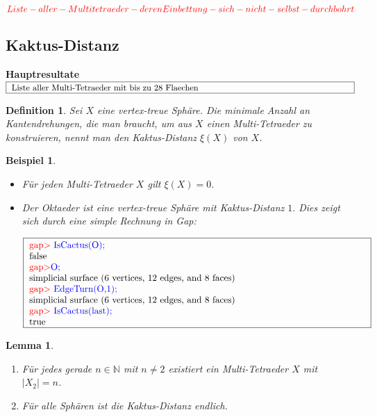 \documentclass[12pt,titlepage,twoside,cleardoublepage]{article}
\theoremstyle{nummermitklammern}
\newtheorem{lemma}[temp]{Lemma}
\newtheorem{bsp}[temp]{Beispiel}
\newtheorem{definition}[temp]{Definition}
\newtheorem{definition}[zahl]{Definition}
\newtheorem{lemma}[zahl]{Lemma}
\newtheorem{bsp}[zahl]{Beispiel}
\numberwithin{equation}{section}
\begin{document}
$\textcolor{red}{Liste-aller-Multitetraeder-deren Einbettung-sich-nicht-selbst-durchbohrt}$
\subsection{Kaktus-Distanz}
\textbf{Hauptresultate}\\
$\fbox{
\parbox{14cm}{Liste aller Multi-Tetraeder mit bis zu 28 Flaechen}}$
\begin{definition}
Sei $X$ eine vertex-treue Sphäre. Die minimale Anzahl an Kantendrehungen, die man braucht, um aus $X$ einen Multi-Tetraeder zu  konstruieren, nennt man den \emph{Kaktus-Distanz} $\xi(X)$ von $X$.
\end{definition}
\begin{bsp}
\begin{itemize}
\item Für jeden Multi-Tetraeder $X$ gilt $\xi(X)=0.$
\item Der Oktaeder ist eine vertex-treue Sphäre mit Kaktus-Distanz $1.$ Dies zeigt sich durch eine simple Rechnung in Gap:
\begin{center}
$\fbox{
\parbox{13cm}{
\textcolor{red}{gap$>$} \textcolor{blue}{IsCactus(O);}\\
false\\
\textcolor{red}{gap$>$}\textcolor{blue}{ O;}\\
simplicial surface (6 vertices, 12 edges, and 8 faces)\\
\textcolor{red}{gap$>$} \textcolor{blue}{EdgeTurn(O,1);}\\
simplicial surface (6 vertices, 12 edges, and 8 faces)\\
\textcolor{red}{gap$>$} \textcolor{blue}{IsCactus(last);}\\
true
}}$
\end{center}
\end{itemize}
\end{bsp}
\begin{lemma}
\begin{enumerate}
\item
Für jedes gerade $n \in \mathbb{N}$ mit $n \neq 2$ existiert ein Multi-Tetraeder $X$ mit $\vert X_2\vert=n$.
\item
Für alle Sphären ist die Kaktus-Distanz endlich.
\end{enumerate} 
\end{lemma}
\end{document}
